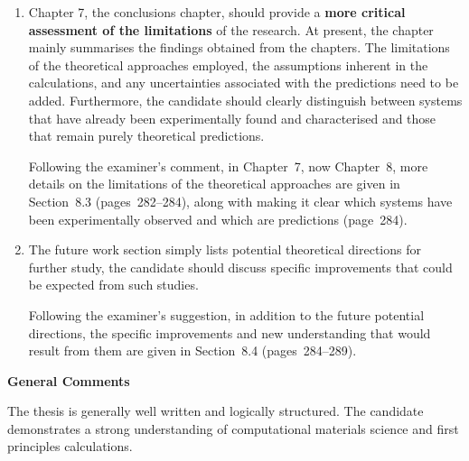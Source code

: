 \documentclass[12pt,a4paper]{article}
\newenvironment{reply}{\par\medskip\color{replyblue}}{\par\medskip}
\begin{document}
\begin{enumerate}[leftmargin=*]
\begin{enumerate}[label=\arabic*.,leftmargin=*]
\begin{reply}
Following the examiner's note, an explanation that hydrogenating the trilayer was considered, but the resulting structures were dynamically unstable, is provided in Section~7.4.1 (pages~217--218).
\end{reply}

\item AIMD simulations are presented to support structural stability; however methodological details, including the simulation ensemble, temperature, time step, and total simulation time, are omitted.

\begin{reply}
The AIMD simulations were done at a temperature of 300~K, the time step was 0.5~fs, the total simulation time was 5.5~ps, and the ensemble was the canonical (NVT) ensemble with a Nos\'e--Hoover thermostat.
These details are now given in the methods section, Section~7.3 (page~211).
\end{reply}

\end{enumerate}

\item Chapter 7, the conclusions chapter, should provide a \textbf{more critical assessment of the limitations} of the research. At present, the chapter mainly summarises the findings obtained from the chapters. The limitations of the theoretical approaches employed, the assumptions inherent in the calculations, and any uncertainties associated with the predictions need to be added. Furthermore, the candidate should clearly distinguish between systems that have already been experimentally found and characterised and those that remain purely theoretical predictions.

\begin{reply}
Following the examiner's comment, in Chapter~7, now Chapter~8, more details on the limitations of the theoretical approaches are given in Section~8.3 (pages~282--284), along with making it clear which systems have been experimentally observed and which are predictions (page~284).
\end{reply}

\item The future work section simply lists potential theoretical directions for further study, the candidate should discuss specific improvements that could be expected from such studies.

\begin{reply}
Following the examiner's suggestion, in addition to the future potential directions, the specific improvements and new understanding that would result from them are given in Section~8.4 (pages~284--289).
\end{reply}

\end{enumerate}

\textbf{General Comments}

The thesis is generally well written and logically structured. The candidate demonstrates a strong understanding of computational materials science and first principles calculations.
\end{document}
